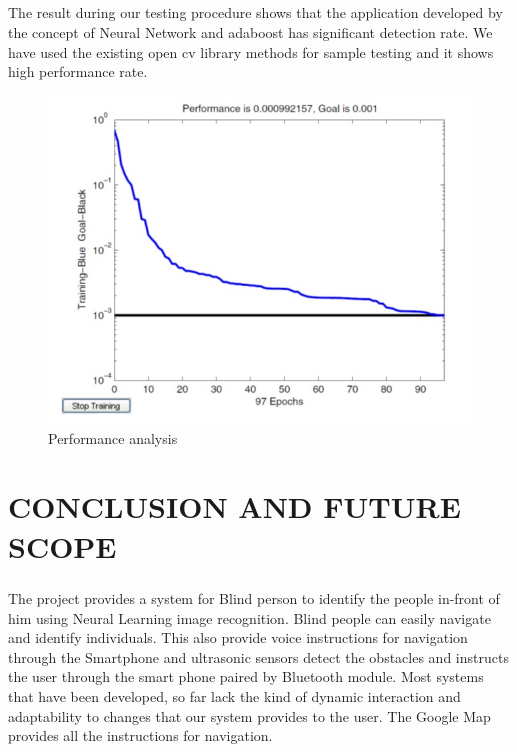 \documentclass[10pt,a4paper,twoside]{report}
\newcommand\blankpage{
	\null
	\thispagestyle{empty}
	\addtocounter{page}{-1}
	\newpage}
\begin{document}
\paragraph{ }The result during our testing procedure shows that the application developed by the concept of Neural Network and adaboost has significant detection rate. We have used the existing open cv library methods for sample testing and it shows high performance rate. 
\begin{figure}[htpb]
\begin{center}

\includegraphics[scale=.5]{performance}
\caption{Performance analysis}


\end{center}
\end{figure}
\newpage
\blankpage
\chapter{CONCLUSION AND FUTURE SCOPE}
\paragraph{ }The project provides a system for Blind person to identify the people in-front of him using Neural Learning image recognition. Blind people can easily navigate and identify individuals. This also provide voice instructions for navigation through the Smartphone and ultrasonic sensors detect the obstacles and instructs the user through the smart phone paired by Bluetooth module. Most systems that have been developed, so far lack the kind of dynamic interaction and adaptability to changes that our system provides to the user. The Google Map provides all the instructions for navigation.
\end{document}
